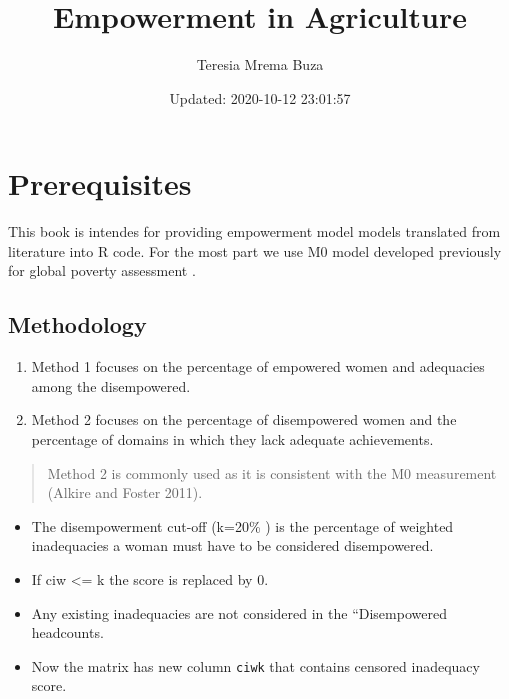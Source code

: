 \documentclass[
]{book}
\title{Empowerment in Agriculture}
\author{Teresia Mrema Buza}
\date{Updated: 2020-10-12 23:01:57}
\providecommand{\tightlist}{%
  \setlength{\itemsep}{0pt}\setlength{\parskip}{0pt}}
\begin{document}
\maketitle

{
\setcounter{tocdepth}{1}
\tableofcontents
}
\hypertarget{prerequisites}{%
\chapter{Prerequisites}\label{prerequisites}}

This book is intendes for providing empowerment model models translated from literature into R code. For the most part we use M0 model developed previously for global poverty assessment \citep{Alkire2011}.

\hypertarget{methodology}{%
\section{Methodology}\label{methodology}}

\begin{tmbinfo}
\begin{enumerate}
\def\labelenumi{\arabic{enumi}.}
\tightlist
\item
  Method 1 focuses on the percentage of empowered women and adequacies
  among the disempowered.
\item
  Method 2 focuses on the percentage of disempowered women and the
  percentage of domains in which they lack adequate achievements.
\end{enumerate}

\begin{quote}
Method 2 is commonly used as it is consistent with the M0 measurement
(Alkire and Foster 2011).
\end{quote}

\begin{itemize}
\tightlist
\item
  The disempowerment cut-off (k=20\% ) is the percentage of weighted
  inadequacies a woman must have to be considered disempowered.
\item
  If ciw \textless= k the score is replaced by 0.
\item
  Any existing inadequacies are not considered in the ``Disempowered
  headcounts.
\item
  Now the matrix has new column \texttt{ciwk} that contains censored
  inadequacy score.
\end{itemize}
\end{tmbinfo}
\end{document}
